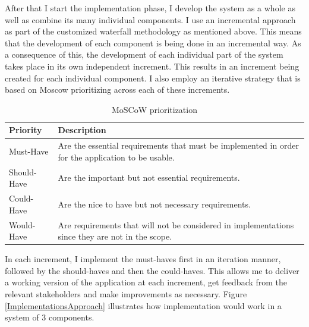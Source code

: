 \begin{justify}
\vspace{0.25cm}
\newendline After that I start the implementation phase, I develop the system as a whole as well as combine its many individual components. I use an incremental approach as part of the customized waterfall methodology as mentioned above. This means that the development of each component is being done in an incremental way. As a consequence of this, the development of each individual part of the system takes place in its own independent increment. This results in an increment being created for each individual component. I also employ an iterative strategy that is based on Moscow prioritizing across each of these increments.

\renewcommand{\arraystretch}{1.4}
\begin{table}[H]
    \centering
    \caption{MoSCoW prioritization}
    \begin{tabular}{|p{4cm}|p{10.5cm}|} 
    \hline
    \rowcolor[rgb]{0.851,0.851,0.898} \textbf{Priority} & \textbf{Description}                                                                                                   \\ 
    \hline
    Must-Have                                           & Are the essential requirements that must be implemented in order for the application to be usable.                     \\ 
    \hline
    Should-Have                                         & Are the important but not essential requirements.                                                                      \\ 
    \hline
    Could-Have                                          & Are the nice to have but not necessary requirements.                                                                 \\ 
    \hline
    Would-Have                                          & Are requirements that will not be considered in implementations since they are not in the scope.  \\
    \hline
    \end{tabular}
\end{table}

\vspace{1cm}

\noindent
In each increment, I implement the must-haves first in an iteration manner, followed by the should-haves and then the could-haves. This allows me to deliver a working version of the application at each increment, get feedback from the relevant stakeholders and make improvements as necessary. Figure \ref{ImplementationsApproach} illustrates how implementation would work in a system of 3 components.


\end{justify}
